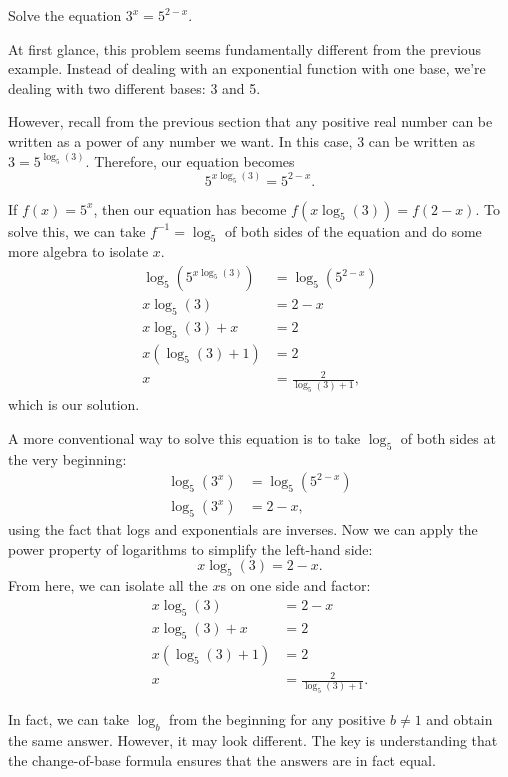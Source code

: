 \documentclass[nooutcomes]{ximera}
\begin{document}
\begin{example}
Solve the equation $3^x = 5^{2 - x}$. 
\end{example}

\begin{explanation}
At first glance, this problem seems fundamentally different from the previous example. Instead of dealing with an exponential function with one base, we're dealing with two different bases: 3 and 5. 

However, recall from the previous section that any positive real number can be written as a power of any number we want. In this case, 3 can be written as $3 = 5^{\log_5(3)}$. Therefore, our equation becomes
$$
5^{x\log_5(3)} = 5^{2 - x}.
$$

If $f(x) = 5^x$, then our equation has become $f(x \log_5(3)) = f(2 - x)$. To solve this, we can take $f^{-1} = \log_5$ of both sides of the equation and do some more algebra to isolate $x$. 
\begin{align*}
\log_5(5^{x \log_5(3)}) & = \log_5(5^{2 -x }) \\
x\log_5(3) & = 2 - x \\
x\log_5(3) + x & = 2 \\
x(\log_5(3) + 1) & = 2 \\
x & = \frac{2}{\log_5(3) + 1},
\end{align*}
which is our solution.

A more conventional way to solve this equation is to take $\log_5$ of both sides at the very beginning:
\begin{align*}
\log_5(3^x) & = \log_5(5^{2 - x}) \\
\log_5(3^x) & = 2 - x,
\end{align*}
using the fact that logs and exponentials are inverses. Now we can apply the power property of logarithms to simplify the left-hand side:
$$
x\log_5(3) = 2 - x.
$$
From here, we can isolate all the $x$s on one side and factor:
\begin{align*}
x\log_5(3) & = 2 - x \\
x\log_5(3) + x & = 2 \\
x(\log_5(3) + 1) & = 2 \\
x & = \frac{2}{\log_5(3) + 1}.
\end{align*}

\end{explanation}

\begin{callout}
In fact, we can take $\log_b$ from the beginning for any positive $b \ne 1$ and obtain the same answer. However, it may look different. The key is understanding that the change-of-base formula ensures that the answers are in fact equal. 
\end{callout}
\end{document}
